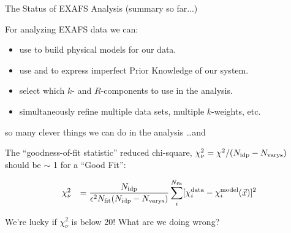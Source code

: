 \begin{slide}{The Status of EXAFS Analysis (summary so far...)}
    
   For analyzing EXAFS data we can:
    
    \begin{itemize}
    \item use {} to build physical models for our data.
      
    \item use {} and {} to
      express imperfect Prior Knowledge of our system.
      
    \item select which $k$- and $R$-components to use in the analysis.

    \item simultaneously refine multiple data sets, multiple $k$-weights,
      etc. 

    \end{itemize}

    so many clever things we can do in the analysis \ldots and
    
    {\begin{center} \large {} 
      \end{center} }

    \vmm
    
    The ``goodness-of-fit statistic'' reduced chi-square, $\chi^2_\nu =
    \chi^2 / (N_{\rm idp}-N_{\rm varys})$ should be $\sim$ 1 for a ``Good
    Fit'':

    \[    \begin{array}{ll}
      \chi^2_\nu & = \displaystyle \frac{N_{\rm idp}}{\epsilon^2 N_{\rm fit} (N_{\rm 
          idp}-N_{\rm varys})} 
      \sum_i^{N_{\rm fit}} [\chi_i^{\rm data} - \chi_i^{\rm
      model}(\vec{x})]^2 \\
    \end{array}
    \]
    
    \vmm
    
    We're lucky if $\chi_\nu^2$ is below 20!  \hspace{4mm}
    What are we doing wrong?

\vspace{1mm}

\vfill
\end{slide} 


